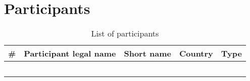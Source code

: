 \section{Participants}
\begin{longtable}[H]{p{1cm} p{5.7cm} p{2cm} p{2cm} p{2cm}}
	\toprule[2pt]
	
	\textbf{\#} & \textbf{Participant legal name} & \textbf{Short name} & \textbf{Country} & \textbf{Type} \\
	
	\midrule[1.5pt] 
	\endhead
	
	&  &  &  &  \vspace{0.2cm} \\
	
	\midrule
	
	&  &  &  &  \vspace{0.2cm} \\
	
	\midrule
	
	&  &  &  &  \vspace{0.2cm} \\
	
	\midrule
	
	&  &  &  &  \vspace{0.2cm} \\
	
	\bottomrule[2pt]
	
	\caption{List of participants}
\end{longtable}

